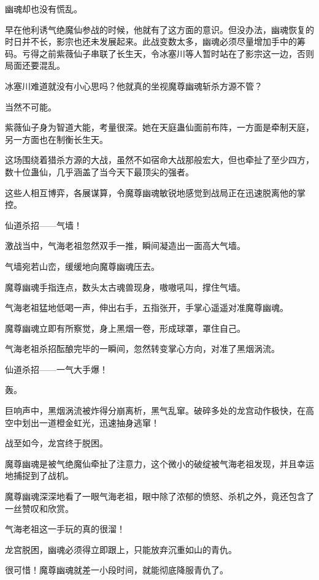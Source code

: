 \begin{this_body}
幽魂却也没有慌乱。

早在他利诱气绝魔仙参战的时候，他就有了这方面的意识。但没办法，幽魂恢复的时日并不长，影宗也还未发展起来。此战变数太多，幽魂必须尽量增加手中的筹码。亏得之前紫薇仙子串联了长生天，令冰塞川等人暂时站在了影宗这一边，否则局面还要混乱。

冰塞川难道就没有小心思吗？他就真的坐视魔尊幽魂斩杀方源不管？

当然不可能。

紫薇仙子身为智道大能，考量很深。她在天庭蛊仙面前布阵，一方面是牵制天庭，另一方面也在制衡长生天。

这场围绕着猎杀方源的大战，虽然不如宿命大战那般宏大，但也牵扯了至少四方，数十位蛊仙，几乎涵盖了当今天下最顶尖的强者。

这些人相互博弈，各展谋算，令魔尊幽魂敏锐地感觉到战局正在迅速脱离他的掌控。

仙道杀招——气墙！

激战当中，气海老祖忽然双手一推，瞬间凝造出一面高大气墙。

气墙宛若山峦，缓缓地向魔尊幽魂压去。

魔尊幽魂手指连点，数头太古魂兽现身，嗷嗷吼叫，撑住气墙。

气海老祖猛地低喝一声，伸出右手，五指张开，手掌心遥遥对准魔尊幽魂。

魔尊幽魂立即有所察觉，身上黑烟一卷，形成球罩，罩住自己。

气海老祖杀招酝酿完毕的一瞬间，忽然转变掌心方向，对准了黑烟涡流。

仙道杀招——一气大手爆！

轰。

巨响声中，黑烟涡流被炸得分崩离析，黑气乱窜。破碎多处的龙宫动作极快，在高空中划出一道橙金虹光，迅速抽身逃窜！

战至如今，龙宫终于脱困。

魔尊幽魂是被气绝魔仙牵扯了注意力，这个微小的破绽被气海老祖发现，并且幸运地捕捉到了战机。

魔尊幽魂深深地看了一眼气海老祖，眼中除了浓郁的愤怒、杀机之外，竟还包含了一丝赞叹和欣赏。

气海老祖这一手玩的真的很溜！

龙宫脱困，幽魂必须得立即跟上，只能放弃沉重如山的青仇。

很可惜！魔尊幽魂就差一小段时间，就能彻底降服青仇了。

\end{this_body}

